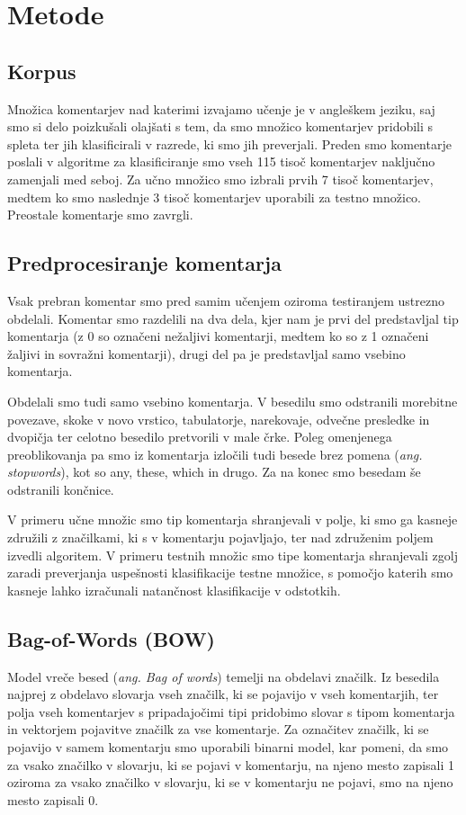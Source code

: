 \documentclass{acm_proc_article-sp}
\begin{document}
\section{Metode}
\subsection{Korpus}
Množica komentarjev nad katerimi izvajamo učenje je v angleškem jeziku, saj smo si delo poizkušali olajšati s tem, da smo množico komentarjev pridobili s spleta ter jih klasificirali v razrede, ki smo jih preverjali. 
Preden smo komentarje poslali v algoritme za klasificiranje smo vseh 115 tisoč komentarjev naključno zamenjali med seboj. 
Za učno množico smo izbrali prvih 7 tisoč komentarjev, medtem ko smo naslednje 3 tisoč komentarjev uporabili za testno množico. Preostale komentarje smo zavrgli.

\subsection{Predprocesiranje komentarja}
Vsak prebran komentar smo pred samim učenjem oziroma testiranjem ustrezno obdelali. Komentar smo razdelili na dva dela, kjer nam je prvi del predstavljal tip komentarja (z 0 so označeni nežaljivi komentarji, medtem ko so z 1 označeni žaljivi in sovražni komentarji), drugi del pa je predstavljal samo vsebino komentarja. 

Obdelali smo tudi samo vsebino komentarja. V besedilu smo odstranili morebitne povezave, skoke v novo vrstico, tabulatorje, narekovaje, odvečne presledke in dvopičja ter celotno besedilo pretvorili v male črke. Poleg omenjenega preoblikovanja pa smo iz komentarja izločili tudi besede brez pomena ({\it ang. stopwords}), kot so any, these, which in drugo. Za na konec smo besedam še odstranili končnice.

V primeru učne množic smo tip komentarja shranjevali v polje, ki smo ga kasneje združili z značilkami, ki s v komentarju pojavljajo, ter nad združenim poljem izvedli algoritem. V primeru testnih množic smo tipe komentarja shranjevali zgolj zaradi preverjanja uspešnosti klasifikacije testne množice, s pomočjo katerih smo kasneje lahko izračunali natančnost klasifikacije v odstotkih.

\subsection{Bag-of-Words (BOW)}
Model vreče besed ({\it ang. Bag of words}) temelji na obdelavi značilk.
Iz besedila najprej z obdelavo slovarja vseh značilk, ki se pojavijo v vseh komentarjih, ter polja vseh komentarjev s pripadajočimi tipi pridobimo slovar s tipom komentarja in vektorjem pojavitve značilk za vse komentarje.
Za označitev značilk, ki se pojavijo v samem komentarju smo uporabili binarni model, kar pomeni, da smo za vsako značilko v slovarju, ki se pojavi v komentarju, na njeno mesto zapisali 1 oziroma za vsako značilko v slovarju, ki se v komentarju ne pojavi, smo na njeno mesto zapisali 0.
\end{document}
